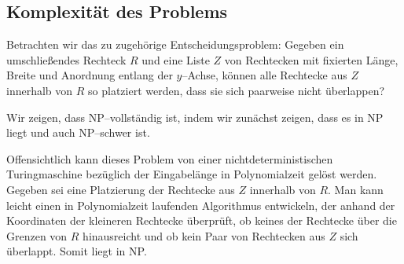 \subsection{Komplexität des Problems}

Betrachten wir das zu \fp{} zugehörige Entscheidungsproblem:
Gegeben ein umschließendes Rechteck $R$ und eine Liste $Z$
von Rechtecken mit fixierten Länge, Breite und Anordnung entlang der $y$--Achse,
können alle Rechtecke aus $Z$ innerhalb von $R$ so platziert werden, dass
sie sich paarweise nicht überlappen?

Wir zeigen, dass \fp{} NP--vollständig ist, indem wir zunächst zeigen, dass
es in NP liegt und auch NP--schwer ist.

Offensichtlich kann dieses Problem von einer nichtdeterministischen
Turingmaschine bezüglich der Eingabelänge in Polynomialzeit gelöst werden.
Gegeben sei eine Platzierung der Rechtecke aus $Z$ innerhalb von $R$. 
Man kann leicht einen in Polynomialzeit laufenden Algorithmus entwickeln, der
anhand der Koordinaten der kleineren Rechtecke überprüft, ob keines
der Rechtecke über die Grenzen von $R$ hinausreicht und ob
kein Paar von Rechtecken aus $Z$ sich überlappt.  
Somit liegt \fp{} in NP.




